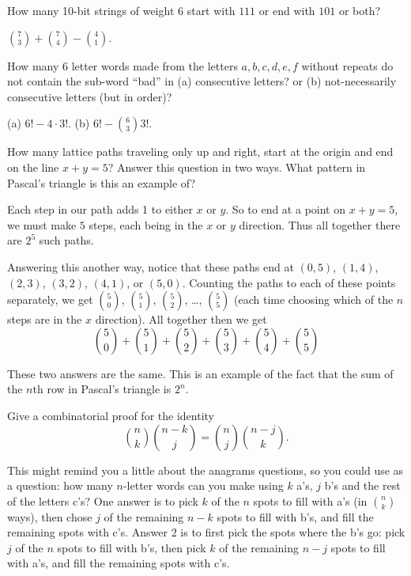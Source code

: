 \begin{questions}
\question How many 10-bit strings of weight 6 start with $111$ or end with $101$ or both?

	\begin{answer}
		${7 \choose 3} + {7 \choose 4} - {4 \choose 1}$.
	\end{answer}




\question How many 6 letter words made from the letters $a,b,c,d,e,f$ without repeats do not contain the sub-word ``bad'' in (a) consecutive letters? or (b) not-necessarily consecutive letters (but in order)?

	\begin{answer}
		(a) $6! - 4\cdot 3!$.  (b) $6! - {6 \choose 3}3!$.
	\end{answer}




\question How many lattice paths traveling only up and right, start at the origin and end on the line $x + y = 5$?  Answer this question in two ways.  What pattern in Pascal's triangle is this an example of?

	\begin{answer}
		Each step in our path adds 1 to either $x$ or $y$.  So to end at a point on $x+y = 5$, we must make $5$ steps, each being in the $x$ or $y$ direction.  Thus all together there are $2^5$ such paths.

    Answering this another way, notice that these paths end at $(0,5)$,  $(1,4)$, $(2, 3)$, $(3,2)$, $(4,1)$, or $(5,0)$.  Counting the paths to each of these points separately, we get ${5 \choose 0}$, ${5 \choose 1}$, ${5 \choose 2}$, \ldots, ${5 \choose 5}$ (each time choosing which of the $n$ steps are in the $x$ direction).  All together then we get
    \[{5 \choose 0} + {5 \choose 1} + {5\choose 2} + {5 \choose 3} + {5 \choose 4} + {5 \choose 5}\]

    These two answers are the same.  This is an example of the fact that the sum of the $n$th row in Pascal's triangle is $2^n$.
	\end{answer}


\question Give a combinatorial proof for the identity
\[{n \choose k}{n-k \choose j} = {n \choose j}{n-j \choose k}.\]

	\begin{answer}
		This might remind you a little about the anagrams questions, so you could use as a question: how many $n$-letter words can you make using $k$ a's, $j$ b's and the rest of the letters c's?  One answer is to pick $k$ of the $n$ spots to fill with a's (in ${n \choose k}$ ways), then chose $j$ of the remaining $n-k$ spots to fill with b's, and fill the remaining spots with c's.  Answer 2 is to first pick the spots where the b's go: pick $j$ of the $n$ spots to fill with b's, then pick $k$ of the remaining $n-j$ spots to fill with a's, and fill the remaining spots with c's.


\end{answer}
\end{questions}
